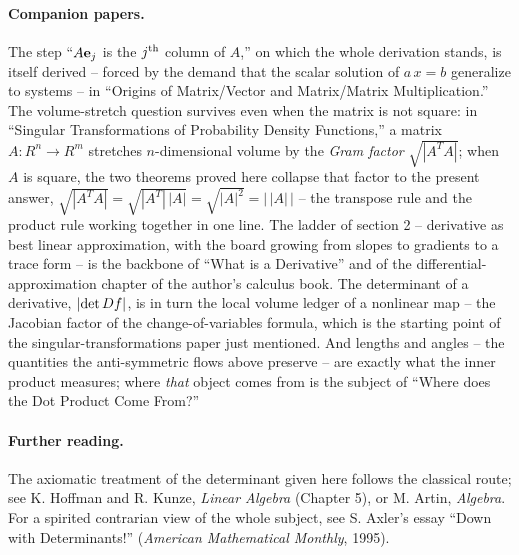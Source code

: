 \documentclass{article}
\begin{document}
\paragraph{Companion papers.} The step ``$A {\bf e}_j$ is the $j^{\rm th}$
column of $A$,'' on which the whole derivation stands, is itself derived --
forced by the demand that the scalar solution of $a\,x = b$ generalize to
systems -- in ``Origins of Matrix/Vector and Matrix/Matrix Multiplication.''
The volume-stretch question survives even when the matrix is not square: in
``Singular Transformations of Probability Density Functions,'' a matrix
$A: R^n \rightarrow R^m$ stretches $n$-dimensional volume by the {\em Gram
factor\/} $\sqrt{|A^T A|}$; when $A$ is square, the two theorems proved here
collapse that factor to the present answer,
$\sqrt{|A^T A|} = \sqrt{|A^T| \, |A|} = \sqrt{|A|^2} = \bigl| \, |A| \, \bigr|$
-- the transpose rule and the product rule working together in one line. The
ladder of section 2 -- derivative as best linear approximation, with the board
growing from slopes to gradients to a trace form -- is the backbone of ``What
is a Derivative'' and of the differential-approximation chapter of the
author's calculus book. The determinant of a derivative, $|{\rm det}\, Df|$,
is in turn the local volume ledger of a nonlinear map -- the Jacobian factor
of the change-of-variables formula, which is the starting point of the
singular-transformations paper just mentioned. And lengths and angles -- the quantities the
anti-symmetric flows above preserve -- are exactly what the inner product
measures; where {\em that\/} object comes from is the subject of ``Where does
the Dot Product Come From?''

\paragraph{Further reading.} The axiomatic treatment of the determinant
given here follows the classical route; see K. Hoffman and R. Kunze,
{\it Linear Algebra\/} (Chapter 5), or M. Artin, {\it Algebra\/}. For a
spirited contrarian view of the whole subject, see S. Axler's essay
``Down with Determinants!'' ({\it American Mathematical Monthly}, 1995).
\end{document}
